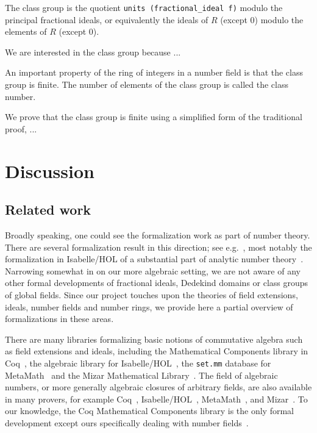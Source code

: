 \documentclass[a4paper,USenglish,cleveref, autoref, thm-restate]{lipics-v2021}
\newcommand{\lean}[1]{\texttt{#1}\xspace} %
\begin{document}
The class group is the quotient \lean{units (fractional\_ideal f)} modulo the principal fractional ideals, or equivalently the ideals of $R$ (except $0$) modulo the elements of $R$ (except $0$).

We are interested in the class group because ...

An important property of the ring of integers in a number field is that the class group is finite. The number of elements of the class group is called the class number.

We prove that the class group is finite using a simplified form of the traditional proof, ...

\section{Discussion}

\subsection{Related work}

Broadly speaking, one could see the formalization work as part of number theory. There are several formalization result in this direction; see e.g.~\cite[Section 6]{CapSetProblem}, most notably the formalization in Isabelle/HOL of a substantial part of analytic number theory~\cite{Eberl19}.
Narrowing somewhat in on our more algebraic setting, we are not aware of any other formal developments of fractional ideals, Dedekind domains or class groups of global fields.
Since our project touches upon the theories of field extensions, ideals, number fields and number rings,
we provide here a partial overview of formalizations in these areas.

There are many libraries formalizing basic notions of commutative algebra such as field extensions and ideals, including the Mathematical Components library in Coq~\cite{mathcomp}, the algebraic library for Isabelle/HOL~\cite{algebra_isabelle}, the \texttt{set.mm} database for MetaMath~\cite{metamath} and the Mizar Mathematical Library~\cite{algebraic-hierarchy_mizar}. The field of algebraic numbers, or more generally algebraic closures of arbitrary fields, are also available in many provers, for example Coq~\cite{real-algebraic-numbers-coq, mathcomp}, Isabelle/HOL~\cite{algebraic-numbers-isabelle}, MetaMath~\cite{algebraic-numbers-metamath}, and Mizar~\cite{algebraic-numbers-mizar}. To our knowledge, the Coq Mathematical Components library is the only formal development except ours specifically dealing with number fields~\cite[\texttt{field/algnum.v}]{mathcomp}.
\end{document}
